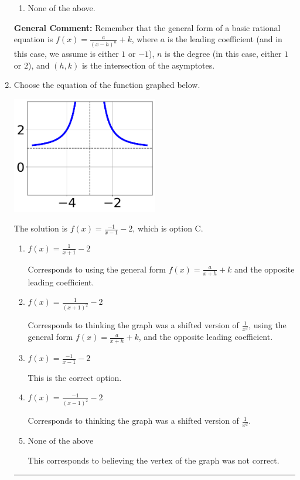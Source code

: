 \documentclass{extbook}[14pt]
\newcommand{\litem}[1]{\item #1

\rule{\textwidth}{0.4pt}}
\begin{document}
\begin{enumerate}
{\begin{enumerate}[label=\Alph*.]
\begin{multicols}{2}
\end{multicols}\item None of the above.\end{enumerate}
\textbf{General Comment:} Remember that the general form of a basic rational equation is $ f(x) = \frac{a}{(x-h)^n} + k$, where $a$ is the leading coefficient (and in this case, we assume is either $1$ or $-1$), $n$ is the degree (in this case, either $1$ or $2$), and $(h, k)$ is the intersection of the asymptotes.
}
\litem{
Choose the equation of the function graphed below.

\begin{center}
    \includegraphics[width=0.5\textwidth]{../Figures/rationalGraphToEquationA.png}
\end{center}


The solution is \( f(x) = \frac{-1}{x - 1} - 2 \), which is option C.\begin{enumerate}[label=\Alph*.]
\item \( f(x) = \frac{1}{x + 1} - 2 \)

Corresponds to using the general form $f(x) = \frac{a}{x+h}+k$ and the opposite leading coefficient.
\item \( f(x) = \frac{1}{(x + 1)^2} - 2 \)

Corresponds to thinking the graph was a shifted version of $\frac{1}{x^2}$, using the general form $f(x) = \frac{a}{x+h}+k$, and the opposite leading coefficient.
\item \( f(x) = \frac{-1}{x - 1} - 2 \)

This is the correct option.
\item \( f(x) = \frac{-1}{(x - 1)^2} - 2 \)

Corresponds to thinking the graph was a shifted version of $\frac{1}{x^2}$.
\item \( \text{None of the above} \)

This corresponds to believing the vertex of the graph was not correct.
\end{enumerate}

}
\end{enumerate}
\end{document}
